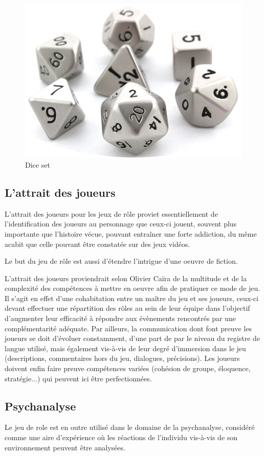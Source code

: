 \begin{figure}[h!]
    \centering
    \includegraphics[width=0.80\linewidth]{img/dice_set.png}
    \caption{Dice set}
\end{figure}

\subsection{L'attrait des joueurs}
L'attrait des joueurs pour les jeux de rôle proviet essentiellement de l'identification des joueurs au personnage que ceux-ci jouent, souvent plus importante que l'histoire vécue, pouvant entraîner une forte addiction, du même acabit que celle pouvant être constatée sur des jeux vidéos.

Le but du jeu de rôle est aussi d'étendre l'intrigue d'une oeuvre de fiction.

L'attrait des joueurs proviendrait selon Olivier Caïra\cite{caira2007jeux} de la multitude et de la complexité des compétences à mettre en oeuvre afin de pratiquer ce mode de jeu. Il s'agit en effet d'une cohabitation entre un maître du jeu et ses joueurs, ceux-ci devant effectuer une répartition des rôles au sein de leur équipe dans l'objectif d'augmenter leur efficacité à répondre aux évènements rencontrés par une complémentarité adéquate. Par ailleurs, la communication dont font preuve les joueurs se doit d'évoluer constamment, d'une part de par le niveau du registre de langue utilisé, mais également vis-à-vis de leur degré d'immersion dans le jeu (descriptions, commentaires hors du jeu, dialogues, précisions). Les joueurs doivent enfin faire preuve compétences variées (cohésion de groupe, éloquence, stratégie...) qui peuvent ici être perfectionnées.

\subsection{Psychanalyse}
Le jeu de role est en outre utilisé dans le domaine de la psychanalyse, considéré comme une aire d'expérience où les réactions de l'individu vis-à-vis de son environnement peuvent être analysées.

